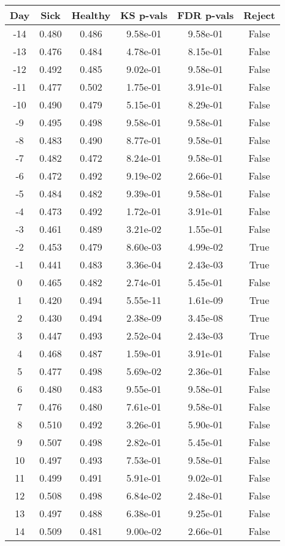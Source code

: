 \begin{tabular}{c|c|c|c|c|c}
Day &  Sick & Healthy &  KS p-vals & FDR p-vals & Reject\\
\hline
-14 & 0.480 &   0.486 &   9.58e-01 &   9.58e-01 &  False\\
-13 & 0.476 &   0.484 &   4.78e-01 &   8.15e-01 &  False\\
-12 & 0.492 &   0.485 &   9.02e-01 &   9.58e-01 &  False\\
-11 & 0.477 &   0.502 &   1.75e-01 &   3.91e-01 &  False\\
-10 & 0.490 &   0.479 &   5.15e-01 &   8.29e-01 &  False\\
 -9 & 0.495 &   0.498 &   9.58e-01 &   9.58e-01 &  False\\
 -8 & 0.483 &   0.490 &   8.77e-01 &   9.58e-01 &  False\\
 -7 & 0.482 &   0.472 &   8.24e-01 &   9.58e-01 &  False\\
 -6 & 0.472 &   0.492 &   9.19e-02 &   2.66e-01 &  False\\
 -5 & 0.484 &   0.482 &   9.39e-01 &   9.58e-01 &  False\\
 -4 & 0.473 &   0.492 &   1.72e-01 &   3.91e-01 &  False\\
 -3 & 0.461 &   0.489 &   3.21e-02 &   1.55e-01 &  False\\
 -2 & 0.453 &   0.479 &   8.60e-03 &   4.99e-02 &   True\\
 -1 & 0.441 &   0.483 &   3.36e-04 &   2.43e-03 &   True\\
  0 & 0.465 &   0.482 &   2.74e-01 &   5.45e-01 &  False\\
  1 & 0.420 &   0.494 &   5.55e-11 &   1.61e-09 &   True\\
  2 & 0.430 &   0.494 &   2.38e-09 &   3.45e-08 &   True\\
  3 & 0.447 &   0.493 &   2.52e-04 &   2.43e-03 &   True\\
  4 & 0.468 &   0.487 &   1.59e-01 &   3.91e-01 &  False\\
  5 & 0.477 &   0.498 &   5.69e-02 &   2.36e-01 &  False\\
  6 & 0.480 &   0.483 &   9.55e-01 &   9.58e-01 &  False\\
  7 & 0.476 &   0.480 &   7.61e-01 &   9.58e-01 &  False\\
  8 & 0.510 &   0.492 &   3.26e-01 &   5.90e-01 &  False\\
  9 & 0.507 &   0.498 &   2.82e-01 &   5.45e-01 &  False\\
 10 & 0.497 &   0.493 &   7.53e-01 &   9.58e-01 &  False\\
 11 & 0.499 &   0.491 &   5.91e-01 &   9.02e-01 &  False\\
 12 & 0.508 &   0.498 &   6.84e-02 &   2.48e-01 &  False\\
 13 & 0.497 &   0.488 &   6.38e-01 &   9.25e-01 &  False\\
 14 & 0.509 &   0.481 &   9.00e-02 &   2.66e-01 &  False\\
\end{tabular}